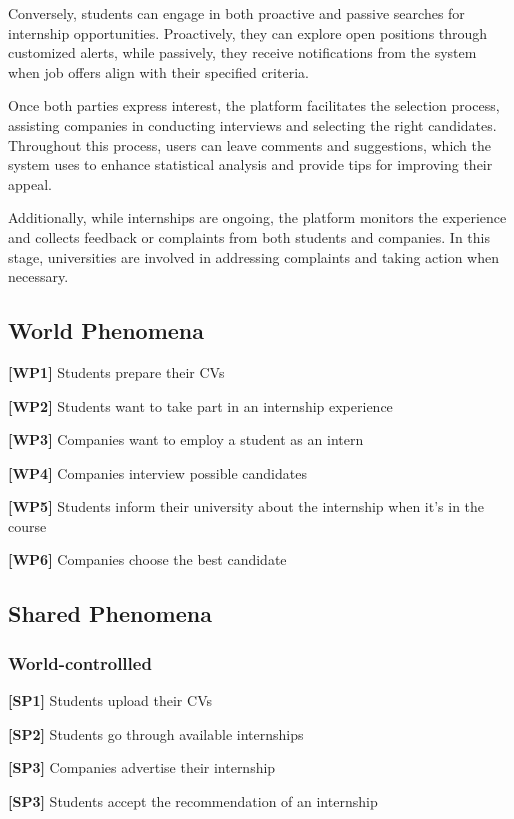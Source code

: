 Conversely, students can engage in both proactive and passive searches for internship opportunities. Proactively, they can explore open positions through customized alerts, while passively, they receive notifications from the system when job offers align with their specified criteria.

Once both parties express interest, the platform facilitates the selection process, assisting companies in conducting interviews and selecting the right candidates. Throughout this process, users can leave comments and suggestions, which the system uses to enhance statistical analysis and provide tips for improving their appeal.

Additionally, while internships are ongoing, the platform monitors the experience and collects feedback or complaints from both students and companies. In this stage, universities are involved in addressing complaints and taking action when necessary.

\subsection{World Phenomena}
\textbf{[WP1]} Students prepare their CVs

\textbf{[WP2]} Students want to take part in an internship experience 

\textbf{[WP3]} Companies want to employ a student as an intern 

\textbf{[WP4]} Companies interview possible candidates 

\textbf{[WP5]} Students inform their university about the internship when it's in the course

\textbf{[WP6]} Companies choose the best candidate

\subsection{Shared Phenomena}

\subsubsection{World-controllled}
\textbf{[SP1]} Students upload their CVs

\textbf{[SP2]} Students go through available internships

\textbf{[SP3]} Companies advertise their internship

\textbf{[SP3]} Students accept the recommendation of an internship

